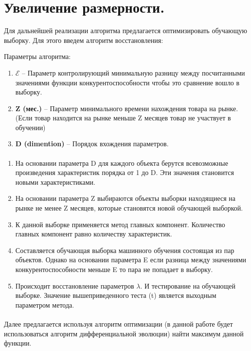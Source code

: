 \documentclass[14pt, a4paper]{extarticle}
\begin{document}
\section{Увеличение размерности.}
Для дальнейшей реализации алгоритма предлагается оптимизировать обучающую выборку. Для этого введем алгоритм восстановления:

Параметры алгоритма:
\begin{enumerate}
  \item\textbf{\(\mathcal{E}\)} -- Параметр контролирующий минимальную разницу между посчитанными значениями функции конкурентоспособности чтобы это сравнение вошло в выборку. 
  \item\textbf{Z (мес.)} -- Параметр минимального времени нахождения товара на рынке. (Если товар находится на рынке меньше Z месяцев товар не участвует в обучении)
  \item\textbf{D (dimention)} -- Порядок вхождения параметров.
\end{enumerate}
\paragraph{}
\begin{enumerate}
    \item На основании параметра D для каждого объекта берутся всевозможные произведения характеристик порядка от 1 до D. Эти значения становится новыми характеристиками.
    \item На основании параметра Z выбираются объекты выборки находящиеся на рынке не менее Z месяцев, которые становятся новой обучающей выборкой.
    \item К данной выборке применяется метод главных компонент. Количество главных компонент равно количеству характеристик.
    \item Составляется обучающая выборка машинного обучения состоящая из пар объектов. Однако на основании параметра E если разница между значениями конкурентоспособности меньше E то пара не попадает в выборку.
    \item Происходит восстановление параметров \(\lambda\). И тестирование на обучающей выборке. Значение вышеприведенного теста (t) является выходным параметром метода.
\end{enumerate}
\paragraph{}
Далее предлагается используя алгоритм оптимизации (в данной работе будет использоваться алгоритм дифференциальной эволюции) найти максимум данной функции. 
\end{document}
